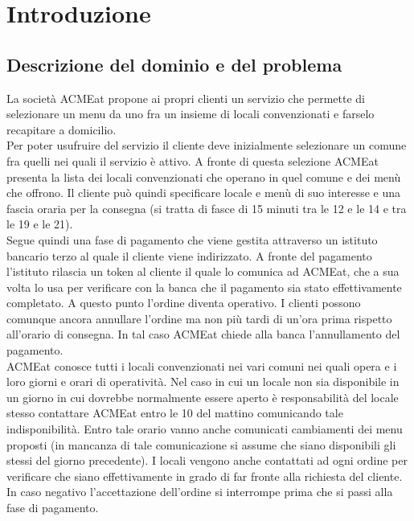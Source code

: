 \documentclass[11pt]{article} %
\begin{document}
\clearpage
\tableofcontents
\thispagestyle{empty}
\newpage

\section{Introduzione}

\subsection{Descrizione del dominio e del problema}
La società ACMEat propone ai propri clienti un servizio che permette di selezionare un menu da uno fra un insieme di locali convenzionati e farselo recapitare a domicilio.\\
Per poter usufruire del servizio il cliente deve inizialmente selezionare un comune fra quelli nei quali il servizio è attivo. A fronte di questa selezione ACMEat presenta la lista dei locali convenzionati che operano in quel comune e dei menù che offrono. Il cliente può quindi specificare locale e menù di suo interesse e una fascia oraria per la consegna (si tratta di fasce di 15 minuti tra le 12 e le 14 e tra le 19 e le 21).\\
Segue quindi una fase di pagamento che viene gestita attraverso un istituto bancario terzo al quale il cliente viene indirizzato. A fronte del pagamento l’istituto rilascia un token al cliente il quale lo comunica ad ACMEat, che a sua volta lo usa per verificare con la banca che il pagamento sia stato effettivamente completato. A questo punto l’ordine diventa operativo. I clienti possono comunque ancora annullare l’ordine ma non più tardi di un’ora prima rispetto all’orario di consegna. In tal caso ACMEat chiede alla banca l’annullamento del pagamento.\\
ACMEat conosce tutti i locali convenzionati nei vari comuni nei quali opera e i loro giorni e orari di operatività. Nel caso in cui un locale non sia disponibile in un giorno in cui dovrebbe normalmente essere aperto è responsabilità del locale stesso contattare ACMEat entro le 10 del mattino comunicando tale indisponibilità. Entro tale orario vanno anche comunicati cambiamenti dei menu proposti (in mancanza di tale comunicazione si assume che siano disponibili gli stessi del giorno precedente). I locali vengono anche contattati ad ogni ordine per verificare che siano effettivamente in grado di far fronte alla richiesta del cliente. In caso negativo l’accettazione dell’ordine si interrompe prima che si passi alla fase di pagamento.\\
\end{document}
